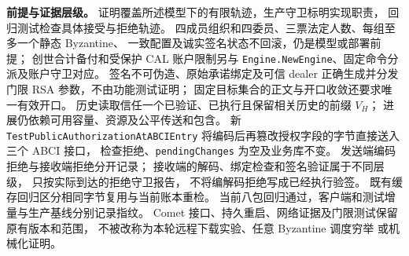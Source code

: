 \noindent\textbf{前提与证据层级。}
证明覆盖所述模型下的有限轨迹，生产守卫标明实现职责，
回归测试检查具体接受与拒绝轨迹。
四成员组织和四委员、三票法定人数、每组至多一个静态 Byzantine、
一致配置及诚实签名状态不回滚，仍是模型或部署前提；
创世合计备付和受保护 CAL 账户限制另与
\texttt{Engine.NewEngine}、固定命令分派及账户守卫对应。
签名不可伪造、原始承诺绑定及可信 dealer 正确生成并分发
门限 RSA 参数，不由功能测试证明；
固定目标集合的正文与开口收敛还要求唯一有效开口。
历史读取信任一个已验证、已执行且保留相关历史的前缀 $V_H$；
进展仍依赖可用容量、资源及公平传送和包含。
新 \texttt{TestPublicAuthorizationAtABCIEntry}
将编码后再篡改授权字段的字节直接送入三个 ABCI 接口，
检查拒绝、\texttt{pendingChanges} 为空及业务库不变。
发送端编码拒绝与接收端拒绝分开记录；
接收端的解码、绑定检查和签名验证属于不同层级，
只按实际到达的拒绝守卫报告，
不将编解码拒绝写成已经执行验签。
既有缓存回归区分相同字节复用与当前账本重检。
当前八包回归通过，客户端和测试增量与生产基线分别记录指纹。
Comet 接口、持久重启、网络证据及门限测试保留原有版本和范围，
不被改称为本轮远程下载实验、任意 Byzantine 调度穷举
或机械化证明。